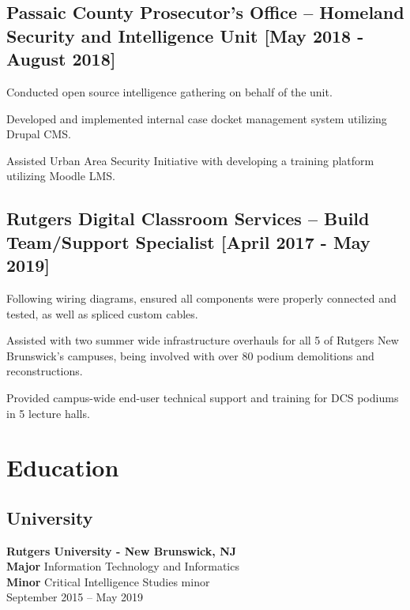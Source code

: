 \documentclass{article}
\begin{document}
\begin{samepage}
\subsection{Passaic County Prosecutor's Office -- Homeland Security and Intelligence Unit [May 2018 - August 2018]}
\begin{compactitem}
	\item Conducted open source intelligence gathering on behalf of the unit.
	\item Developed and implemented internal case docket management system utilizing Drupal CMS.
	\item Assisted Urban Area Security Initiative with developing a training platform utilizing Moodle LMS.
\end{compactitem}
\subsection{Rutgers Digital Classroom Services -- Build Team/Support Specialist [April 2017 - May 2019]}
\begin{compactitem}
	\item Following wiring diagrams, ensured all components were properly connected and tested, as well as spliced custom cables.
	\item Assisted with two summer wide infrastructure overhauls for all 5 of Rutgers New Brunswick's campuses, being involved with over 80 podium demolitions and reconstructions.
	\item Provided campus-wide end-user technical support and training for DCS podiums in 5 lecture halls.
\end{compactitem}

\section{Education}
\noindent%
\begin{minipage}[t]{.55\textwidth}
	\subsection*{University}
	\textbf{Rutgers University - New Brunswick, NJ} \\
	\textbf{Major} Information Technology and Informatics \\
	\textbf{Minor} Critical Intelligence Studies minor \\
	September 2015 -- May 2019
\end{minipage}%
\hfill
\begin{minipage}[t]{.35\textwidth}

\end{minipage}
\end{samepage}
\end{document}

